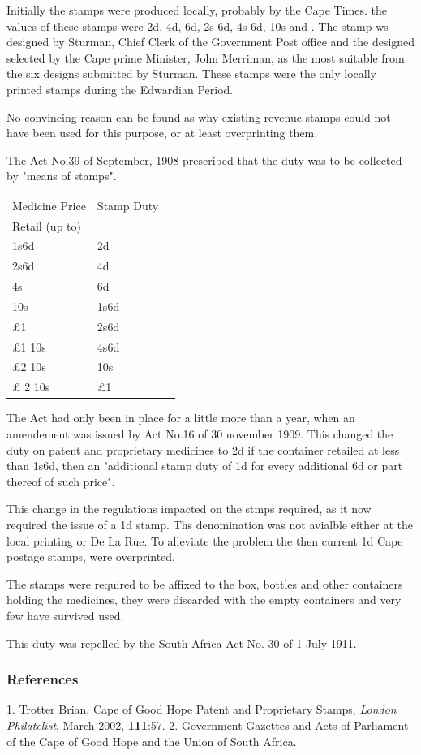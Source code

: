Initially the stamps were produced locally, probably by the Cape Times. the values of these stamps were 2d, 4d, 6d, 2s 6d, 4s 6d, 10s and . The stamp ws designed by Sturman, Chief Clerk of the Government Post office and the designed selected by the Cape prime Minister, John Merriman, as the most suitable from the six designs submitted by Sturman. These stamps were the only locally printed stamps during the Edwardian Period.

No convincing reason can be found as why existing revenue stamps could not have been used for this purpose, or at least overprinting them.




The Act No.39 of September, 1908 prescribed that the duty was to be collected by
"means of stamps".

\begin{tabular}{lll}
Medicine Price     &Stamp Duty\\
Retail (up to)     &         \\
1s6d			   &  2d  \\
2s6d			   &	4d\\
  4s			   &	6d\\
 10s 			   & 1s6d	\\
 £1                & 2s6d \\
 £1 10s            & 4s6d\\
 £2 10s            & 10s\\
 £ 2 10s           & £1\\
\end{tabular}

The Act had only been in place for a little more than a year, when an amendement was issued
by Act No.16 of 30 november 1909. This changed the duty on patent and proprietary medicines to 2d if the container retailed at less than 1s6d, then an "additional stamp duty of 1d for every additional 6d or part thereof of such price".

This change in the regulations impacted on the stmps required, as it now required the
issue of a 1d stamp. Ths denomination was not avialble either at the local printing or De La Rue. To alleviate the problem the then current 1d Cape postage stamps, were overprinted.

The stamps were required to be affixed to the box, bottles and other containers holding the medicines, they were discarded with the empty containers and very few
have survived used.

This duty was repelled by the South Africa Act No. 30 of 1 July 1911.



\subsubsection{References}

1. Trotter Brian, Cape of Good Hope Patent and Proprietary Stamps, \textit{London Philatelist}, March 2002, \textbf{111}:57. 
2. Government Gazettes and Acts of Parliament of the Cape of Good Hope and the Union of South Africa.            
